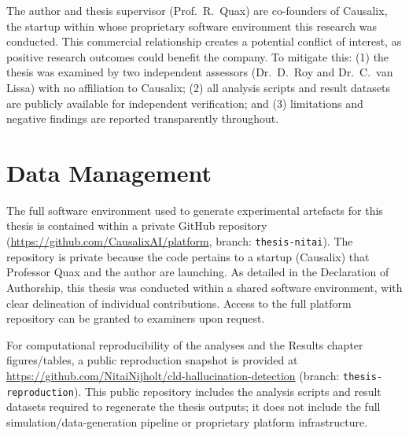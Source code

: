 The author and thesis supervisor (Prof.\ R.\ Quax) are co-founders of Causalix, the startup within whose proprietary software environment this research was conducted. This commercial relationship creates a potential conflict of interest, as positive research outcomes could benefit the company. To mitigate this: (1) the thesis was examined by two independent assessors (Dr.\ D.\ Roy and Dr.\ C.\ van Lissa) with no affiliation to Causalix; (2) all analysis scripts and result datasets are publicly available for independent verification; and (3) limitations and negative findings are reported transparently throughout.

\section{Data Management}

The full software environment used to generate experimental artefacts for this thesis is contained within a private GitHub repository (\url{https://github.com/CausalixAI/platform}, branch: \texttt{thesis-nitai}). The repository is private because the code pertains to a startup (Causalix) that Professor Quax and the author are launching. As detailed in the Declaration of Authorship, this thesis was conducted within a shared software environment, with clear delineation of individual contributions. Access to the full platform repository can be granted to examiners upon request.

For computational reproducibility of the analyses and the Results chapter figures/tables, a public reproduction snapshot is provided at \url{https://github.com/NitaiNijholt/cld-hallucination-detection} (branch: \texttt{thesis-reproduction}). This public repository includes the analysis scripts and result datasets required to regenerate the thesis outputs; it does not include the full simulation/data-generation pipeline or proprietary platform infrastructure.

